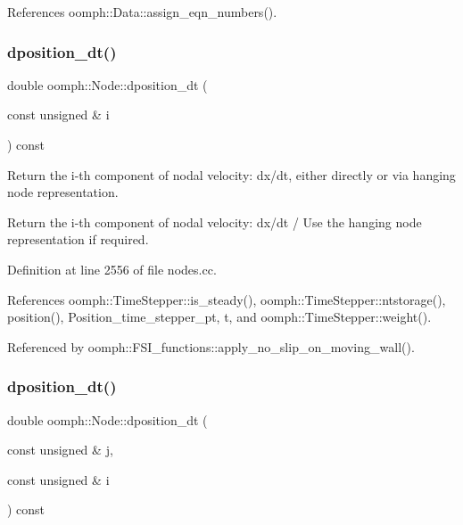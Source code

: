 References oomph\+::\+Data\+::assign\+\_\+eqn\+\_\+numbers().

\mbox{\label{classoomph_1_1Node_ad3d37ea1c80500645fa32cc43f1f29ce}} 
\subsubsection{\texorpdfstring{dposition\+\_\+dt()}{dposition\_dt()}\hspace{0.1cm}{\footnotesize\ttfamily [1/2]}}
{\footnotesize\ttfamily double oomph\+::\+Node\+::dposition\+\_\+dt (\begin{DoxyParamCaption}\item[{const unsigned \&}]{i }\end{DoxyParamCaption}) const}



Return the i-\/th component of nodal velocity\+: dx/dt, either directly or via hanging node representation. 

Return the i-\/th component of nodal velocity\+: dx/dt / Use the hanging node representation if required. 

Definition at line 2556 of file nodes.\+cc.



References oomph\+::\+Time\+Stepper\+::is\+\_\+steady(), oomph\+::\+Time\+Stepper\+::ntstorage(), position(), Position\+\_\+time\+\_\+stepper\+\_\+pt, t, and oomph\+::\+Time\+Stepper\+::weight().



Referenced by oomph\+::\+F\+S\+I\+\_\+functions\+::apply\+\_\+no\+\_\+slip\+\_\+on\+\_\+moving\+\_\+wall().

\mbox{\label{classoomph_1_1Node_a93be34f3311eaaabc026bd1df86b4cf1}} 
\subsubsection{\texorpdfstring{dposition\+\_\+dt()}{dposition\_dt()}\hspace{0.1cm}{\footnotesize\ttfamily [2/2]}}
{\footnotesize\ttfamily double oomph\+::\+Node\+::dposition\+\_\+dt (\begin{DoxyParamCaption}\item[{const unsigned \&}]{j,  }\item[{const unsigned \&}]{i }\end{DoxyParamCaption}) const}



